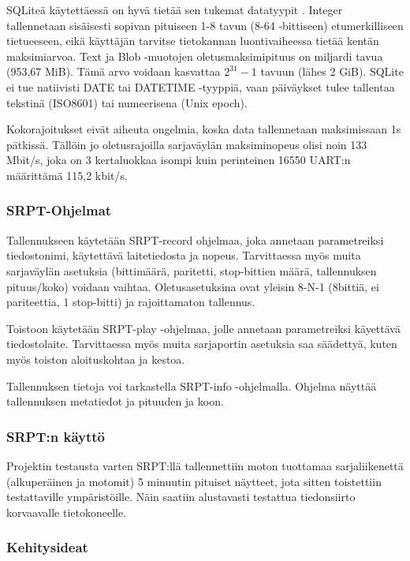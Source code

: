 SQLiteä käytettäessä on hyvä tietää sen tukemat datatyypit \cite{sqlite:datatype3}. Integer tallennetaan sisäisesti sopivan pituiseen 1-8 tavun (8-64 -bittiseen) etumerkilliseen tietueeseen, eikä käyttäjän tarvitse tietokannan luontivaiheessa tietää kentän maksimiarvoa. Text ja Blob -muotojen oletusmaksimipituus on miljardi tavua (953,67 MiB). Tämä arvo voidaan kasvattaa $2^{31}-1$ tavuun (lähes 2 GiB). SQLite ei tue natiivisti DATE tai DATETIME -tyyppiä, vaan päiväykset tulee tallentaa tekstinä (ISO8601) tai numeerisena (Unix epoch).

Kokorajoitukset eivät aiheuta ongelmia, koska data tallennetaan maksimissaan 1s pätkissä. Tällöin jo oletusrajoilla sarjaväylän maksiminopeus olisi noin 133 Mbit/s, joka on 3 kertaluokkaa isompi kuin perinteinen 16550 UART:n määrittämä 115,2 kbit/s.\cite{sqlite:limits}

\subsubsection{SRPT-Ohjelmat}
Tallennukseen käytetään SRPT-record ohjelmaa, joka annetaan parametreiksi tiedostonimi, käytettävä laitetiedosta ja nopeus. Tarvittaessa myös muita sarjaväylän asetuksia (bittimäärä, paritetti, stop-bittien määrä, tallennuksen pituus/koko) voidaan vaihtaa. Oletusasetuksina ovat yleisin 8-N-1 (8bittiä, ei pariteettia, 1 stop-bitti) ja rajoittamaton tallennus.

Toistoon käytetään SRPT-play -ohjelmaa, jolle annetaan parametreiksi käyettävä tiedostolaite. Tarvittaessa myös muita sarjaportin asetuksia saa säädettyä, kuten myös toiston aloituskohtaa ja kestoa.

Tallennuksen tietoja voi tarkastella SRPT-info -ohjelmalla. Ohjelma näyttää tallennuksen metatiedot ja pituuden ja koon.

\subsubsection{SRPT:n käyttö}
Projektin testausta varten SRPT:llä tallennettiin moton tuottamaa sarjaliikenettä (alkuperäinen ja motomit) 5 minuutin pituiset näytteet, jota sitten toistettiin testattaville ympäristöille. Näin saatiin alustavasti testattua tiedonsiirto korvaavalle tietokoneelle.

\subsubsection{Kehitysideat}

